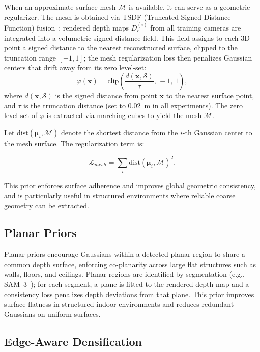 When an approximate surface mesh $\mathcal{M}$ is available, it can serve as a geometric regularizer. The mesh is obtained via TSDF (Truncated Signed Distance Function) fusion~\cite{zhou2018open3d}: rendered depth maps $D_r^{(i)}$ from all training cameras are integrated into a volumetric signed distance field. This field assigns to each 3D point a signed distance to the nearest reconstructed surface, clipped to the truncation range $[-1, 1]$; the mesh regularization loss then penalizes Gaussian centers that drift away from its zero level-set:
\begin{equation}
\varphi(\mathbf{x}) = \mathrm{clip}\!\left(\frac{d(\mathbf{x}, \mathcal{S})}{\tau},\,-1,\,1\right),
\end{equation}
where $d(\mathbf{x}, \mathcal{S})$ is the signed distance from point $\mathbf{x}$ to the nearest surface point, and $\tau$ is the truncation distance (set to 0.02~m in all experiments). The zero level-set of $\varphi$ is extracted via marching cubes to yield the mesh $\mathcal{M}$.

Let $\text{dist}(\boldsymbol{\mu}_i, \mathcal{M})$ denote the shortest distance from the $i$-th Gaussian center to the mesh surface. The regularization term is:

\begin{equation}
\mathcal{L}_{mesh}
=
\sum_{i}
\text{dist}(\boldsymbol{\mu}_i, \mathcal{M})^2.
\end{equation}

This prior enforces surface adherence and improves global geometric consistency, and is particularly useful in structured environments where reliable coarse geometry can be extracted.

\subsection{Planar Priors}

Planar priors encourage Gaussians within a detected planar region to share a common depth surface, enforcing co-planarity across large flat structures such as walls, floors, and ceilings. Planar regions are identified by segmentation (e.g., SAM~3~\cite{sam3}); for each segment, a plane is fitted to the rendered depth map and a consistency loss penalizes depth deviations from that plane. This prior improves surface flatness in structured indoor environments and reduces redundant Gaussians on uniform surfaces.

\subsection{Edge-Aware Densification}

